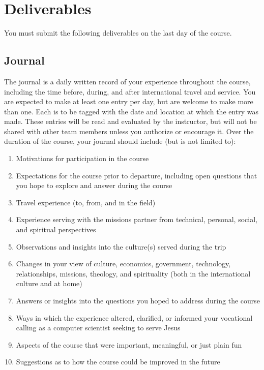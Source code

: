 \documentclass[11pt]{article}
\begin{document}
\section{Deliverables}

You must submit the following deliverables on the last day of the course.

\subsection{Journal}
\label{sec:journal}

The journal is a daily written record
of your experience throughout the course,
including the time before, during, and after
international travel and service.
You are expected to make at least one entry per day,
but are welcome to make more than one.
Each is to be tagged with the date and location at which the entry was made.
These entries will be read and evaluated by the instructor,
but will not be shared with other team members
unless you authorize or encourage it.
Over the duration of the course,
your journal should include (but is not limited to):
\begin{enumerate}
\item
  Motivations for participation in the course
\item
  Expectations for the course prior to departure,
  including open questions that you hope to explore and answer during the course
\item
  Travel experience (to, from, and in the field)
\item
  Experience serving with the missions partner
  from technical, personal, social, and spiritual perspectives
\item
  Observations and insights into the culture(s) served during the trip
\item
  Changes in your view of culture, economics, government,
  technology, relationships, missions, theology, and spirituality
  (both in the international culture and at home)
\item
  Answers or insights into the questions you hoped to address during the course
\item
  Ways in which the experience altered, clarified, or informed
  your vocational calling as a computer scientist seeking to serve Jesus
\item
  Aspects of the course that were important, meaningful, or just plain fun
\item
  Suggestions as to how the course could be improved in the future
\end{enumerate}
\end{document}
